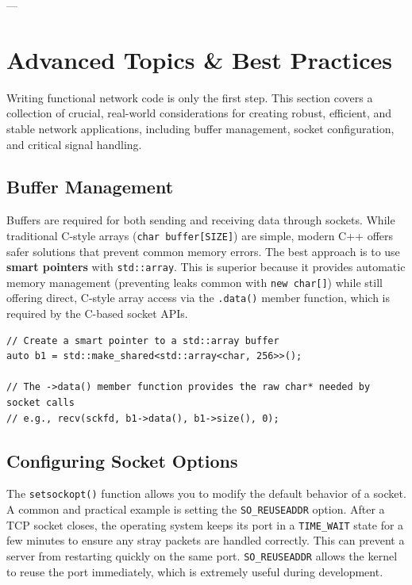 \documentclass{article}
\begin{document}
---

\section[Advanced Topics and Best Practices]{Advanced Topics \& Best Practices}

Writing functional network code is only the first step. This section covers a collection of crucial, real-world considerations for creating robust, efficient, and stable network applications, including buffer management, socket configuration, and critical signal handling.

\subsection{Buffer Management}

Buffers are required for both sending and receiving data through sockets. While traditional C-style arrays (\texttt{char buffer[SIZE]}) are simple, modern C++ offers safer solutions that prevent common memory errors. The best approach is to use \textbf{smart pointers} with \texttt{std::array}. This is superior because it provides automatic memory management (preventing leaks common with \texttt{new char[]}) while still offering direct, C-style array access via the \texttt{.data()} member function, which is required by the C-based socket APIs.

\begin{verbatim}
// Create a smart pointer to a std::array buffer
auto b1 = std::make_shared<std::array<char, 256>>();

// The ->data() member function provides the raw char* needed by socket calls
// e.g., recv(sckfd, b1->data(), b1->size(), 0);
\end{verbatim}

\subsection{Configuring Socket Options}

The \texttt{setsockopt()} function allows you to modify the default behavior of a socket. A common and practical example is setting the \texttt{SO\_REUSEADDR} option. After a TCP socket closes, the operating system keeps its port in a \texttt{TIME\_WAIT} state for a few minutes to ensure any stray packets are handled correctly. This can prevent a server from restarting quickly on the same port. \texttt{SO\_REUSEADDR} allows the kernel to reuse the port immediately, which is extremely useful during development.
\end{document}
